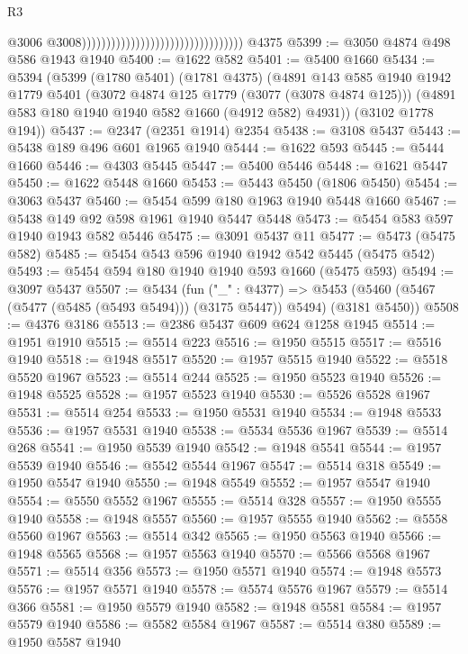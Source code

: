 \begin{lexlean}{R3}
\begin{coremodule}
                                                                      @3006
                                                                      @3008)))))))))))))))))))))))))))))))))
    @4375
@5399 := @3050 @4874 @498 @586 @1943 @1940
@5400 := @1622 @582
@5401 := @5400 @1660
@5434 := @5394
    (@5399
      (@1780 @5401)
      (@1781 @4375)
      (@4891
        @143
        @585
        @1940
        @1942
        @1779
        @5401
        (@3072 @4874 @125 @1779 (@3077 (@3078 @4874 @125)))
        (@4891 @583 @180 @1940 @1940 @582 @1660 (@4912 @582) @4931))
      (@3102 @1778 @194))
@5437 := @2347 (@2351 @1914) @2354
@5438 := @3108 @5437
@5443 := @5438 @189 @496 @601 @1965 @1940
@5444 := @1622 @593
@5445 := @5444 @1660
@5446 := @4303 @5445
@5447 := @5400 @5446
@5448 := @1621 @5447
@5450 := @1622 @5448 @1660
@5453 := @5443 @5450 (@1806 @5450)
@5454 := @3063 @5437
@5460 := @5454 @599 @180 @1963 @1940 @5448 @1660
@5467 := @5438 @149 @92 @598 @1961 @1940 @5447 @5448
@5473 := @5454 @583 @597 @1940 @1943 @582 @5446
@5475 := @3091 @5437 @11
@5477 := @5473 (@5475 @582)
@5485 := @5454 @543 @596 @1940 @1942 @542 @5445 (@5475 @542)
@5493 := @5454 @594 @180 @1940 @1940 @593 @1660 (@5475 @593)
@5494 := @3097 @5437
@5507 := @5434
    (fun ("_" : @4377) =>
    @5453 (@5460 (@5467 (@5477 (@5485 (@5493 @5494))) (@3175 @5447)) @5494) (@3181 @5450))
@5508 := @4376 @3186
@5513 := @2386 @5437 @609 @624 @1258 @1945
@5514 := @1951 @1910
@5515 := @5514 @223
@5516 := @1950 @5515
@5517 := @5516 @1940
@5518 := @1948 @5517
@5520 := @1957 @5515 @1940
@5522 := @5518 @5520 @1967
@5523 := @5514 @244
@5525 := @1950 @5523 @1940
@5526 := @1948 @5525
@5528 := @1957 @5523 @1940
@5530 := @5526 @5528 @1967
@5531 := @5514 @254
@5533 := @1950 @5531 @1940
@5534 := @1948 @5533
@5536 := @1957 @5531 @1940
@5538 := @5534 @5536 @1967
@5539 := @5514 @268
@5541 := @1950 @5539 @1940
@5542 := @1948 @5541
@5544 := @1957 @5539 @1940
@5546 := @5542 @5544 @1967
@5547 := @5514 @318
@5549 := @1950 @5547 @1940
@5550 := @1948 @5549
@5552 := @1957 @5547 @1940
@5554 := @5550 @5552 @1967
@5555 := @5514 @328
@5557 := @1950 @5555 @1940
@5558 := @1948 @5557
@5560 := @1957 @5555 @1940
@5562 := @5558 @5560 @1967
@5563 := @5514 @342
@5565 := @1950 @5563 @1940
@5566 := @1948 @5565
@5568 := @1957 @5563 @1940
@5570 := @5566 @5568 @1967
@5571 := @5514 @356
@5573 := @1950 @5571 @1940
@5574 := @1948 @5573
@5576 := @1957 @5571 @1940
@5578 := @5574 @5576 @1967
@5579 := @5514 @366
@5581 := @1950 @5579 @1940
@5582 := @1948 @5581
@5584 := @1957 @5579 @1940
@5586 := @5582 @5584 @1967
@5587 := @5514 @380
@5589 := @1950 @5587 @1940

\end{coremodule}
\end{lexlean}
